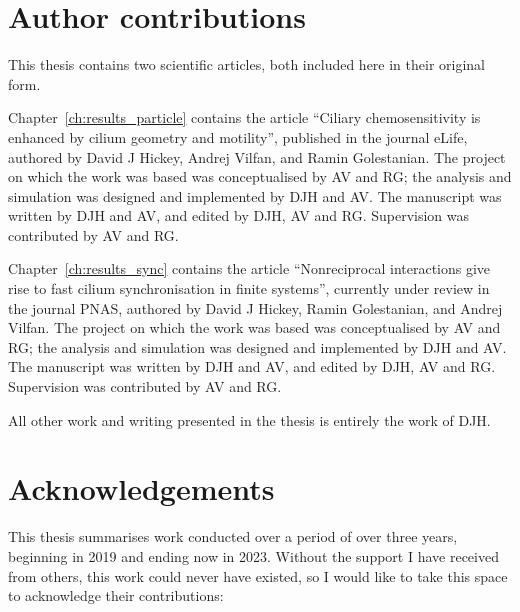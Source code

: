 \chapter*{Author contributions}

This thesis contains two scientific articles, both included here in their original form.

Chapter~\ref{ch:results_particle} contains the article ``Ciliary chemosensitivity is enhanced by cilium geometry and motility'', published in the journal eLife, authored by David J Hickey, Andrej Vilfan, and Ramin Golestanian. The project on which the work was based was conceptualised by AV and RG; the analysis and simulation was designed and implemented by DJH and AV. The manuscript was written by DJH and AV, and edited by DJH, AV and RG. Supervision was contributed by AV and RG.

Chapter~\ref{ch:results_sync} contains the article ``Nonreciprocal interactions give rise to fast cilium synchronisation in finite systems'', currently under review in the journal PNAS, authored by David J Hickey, Ramin Golestanian, and Andrej Vilfan. The project on which the work was based was conceptualised by AV and RG; the analysis and simulation was designed and implemented by DJH and AV. The manuscript was written by DJH and AV, and edited by DJH, AV and RG. Supervision was contributed by AV and RG.

All other work and writing presented in the thesis is entirely the work of DJH. %

\clearpage

\chapter*{Acknowledgements}


This thesis summarises work conducted over a period of over three years, beginning in 2019 and ending now in 2023. Without the support I have received from others, this work could never have existed, so I would like to take this space to acknowledge their contributions:

